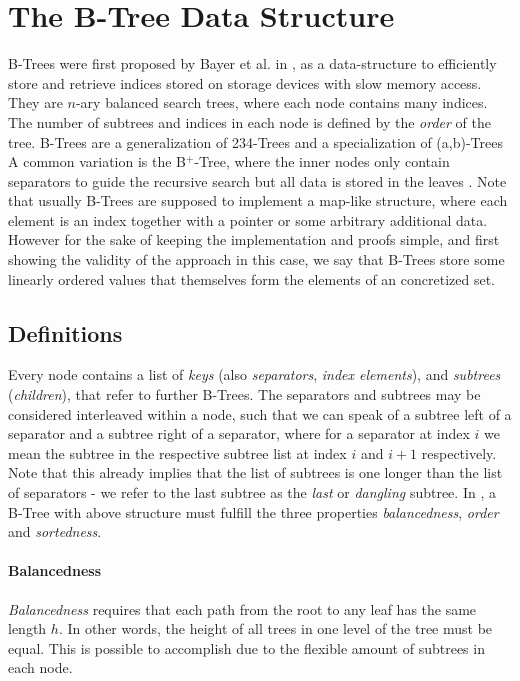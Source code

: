\section{The B-Tree Data Structure}

B-Trees were first proposed by Bayer et al. in \parencite{DBLP:journals/acta/BayerM72},
as a data-structure to efficiently store and retrieve indices stored on storage devices
with slow memory access.
They are $n$-ary balanced search trees, where each
node contains many indices.
The number of subtrees and indices in each node is
defined by the \textit{order} of the tree.
B-Trees are a generalization of 234-Trees and a specialization of (a,b)-Trees
A common variation is the B$^+$-Tree, where the inner nodes
only contain separators to guide the recursive search
but all data is stored in the leaves \parencite{DBLP:journals/csur/Comer79}.
Note that usually B-Trees are supposed to implement a map-like
structure, where each element is an index together with a pointer
or some arbitrary additional data.
However for the sake of keeping the implementation and proofs simple,
and first showing the validity of the approach in this case,
we say that B-Trees store some linearly ordered values
that themselves form the elements of an concretized set.

\subsection{Definitions}
\label{sec:data_structure_defs}

Every node contains a list of \textit{keys} (also \textit{separators}, \textit{index elements}), and \textit{subtrees} (\textit{children}),
that refer to further B-Trees.
The separators and subtrees may be considered interleaved within a node,
such that we can speak of a subtree left of a separator and a subtree right of a separator,
where for a separator at index $i$ we mean the subtree in the respective
subtree list at index $i$ and $i+1$ respectively.
Note that this already implies that the list of subtrees is one
longer than the list of separators - we refer to the last subtree
as the \textit{last} or \textit{dangling} subtree.
In \parencite{DBLP:journals/acta/BayerM72},
a B-Tree with above structure must fulfill the three properties
\textit{balancedness}, \textit{order} and \textit{sortedness}.

\paragraph{Balancedness} \textit{Balancedness} requires
that each path from the root to any leaf has the same length $h$.
In other words, the height of all trees in one level of the tree must be equal.
This is possible to accomplish due to the flexible amount of subtrees
in each node.

